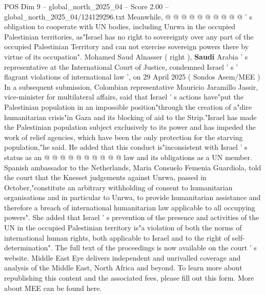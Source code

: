 \begin{textsample}{POS Dim 9 – global\_north\_2025\_04 – Score 2.00 – global\_north\_2025\_04/124129296.txt}
Meanwhile, @ @ @ @ @ @ @ @ @ @ ' s obligation to cooperate with UN bodies, including Unrwa in the occupied Palestinian territories, as"Israel has no right to sovereignty over any part of the occupied Palestinian Territory and can not exercise sovereign powers there by virtue of its occupation".
Mohamed Saud Alnasser ( right ), \textbf{Saudi} Arabia ' s representative at the International Court of Justice, condemned Israel ' s ' flagrant violations of international law ', on 29 April 2025 ( Sondos Asem/MEE ) In a subsequent submission, Colombian representative Mauricio Jaramillo Jassir, vice-minister for multilateral affairs, said that Israel ' s actions have"put the Palestinian population in an impossible position"through the creation of a"dire humanitarian crisis"in Gaza and its blocking of aid to the Strip."Israel has made the Palestinian population subject exclusively to its power and has impeded the work of relief agencies, which have been the only protection for the starving population,"he said.
He added that this conduct is"inconsistent with Israel ' s status as an @ @ @ @ @ @ @ @ @ @ law and its obligations as a UN member.
Spanish ambassador to the Netherlands, Maria Consuelo Femenia Guardiola, told the court that the Knesset judgements against Unrwa, passed in October,"constitute an arbitrary withholding of consent to humanitarian organisations and in particular to Unrwa, to provide humanitarian assistance and therefore a breach of international humanitarian law applicable to all occupying powers".
She added that Israel ' s prevention of the presence and activities of the UN in the occupied Palestinian territory is"a violation of both the norms of international human rights, both applicable to Israel and to the right of self-determination".
The full text of the proceedings is now available on the court ' s website.
Middle East Eye delivers independent and unrivalled coverage and analysis of the Middle East, North Africa and beyond.
To learn more about republishing this content and the associated fees, please fill out this form.
More about MEE can be found here.

\end{textsample}
